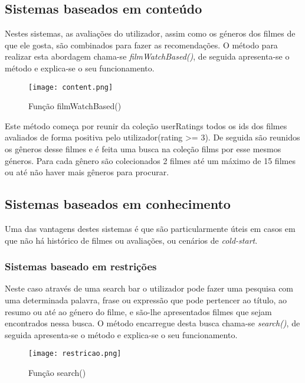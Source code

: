 \subsection{Sistemas baseados em conteúdo}

Nestes sistemas, as avaliações do utilizador, assim como os géneros dos filmes de que ele gosta, são combinados para fazer as recomendações.
O método para realizar esta abordagem chama-se \textit{filmWatchBased()}, de seguida apresenta-se o método e explica-se o seu funcionamento.

\begin{figure}[H]
\centering
\texttt{[image: content.png]}
\caption {Função filmWatchBased()}
\label {fig02}
\end{figure}

Este método começa por reunir da coleção userRatings todos os ids dos filmes avaliados de forma positiva pelo utilizador(rating >= 3). De seguida são reunidos os gêneros desse filmes e é feita uma busca na coleção films por esse mesmos géneros. Para cada gênero são colecionados 2 filmes até um máximo de 15 filmes ou até não haver mais gêneros para procurar.


\subsection{Sistemas baseados em conhecimento}


Uma das vantagens destes sistemas é que são particularmente úteis em casos em que não há histórico de filmes ou avaliações, ou cenários de \textit{cold-start}.

\subsubsection{Sistemas baseado em restrições}

Neste caso através de uma search bar o utilizador pode fazer uma pesquisa com uma determinada palavra, frase ou expressão que pode pertencer ao título, ao resumo ou até ao género do filme, e são-lhe apresentados filmes que sejam encontrados nessa busca.
O método encarregue desta busca chama-se \textit{search()}, de seguida apresenta-se o método e explica-se o seu funcionamento.

\begin{figure}[H]
\centering
\texttt{[image: restricao.png]}
\caption {Função search()}
\label {fig03}
\end{figure}
 

